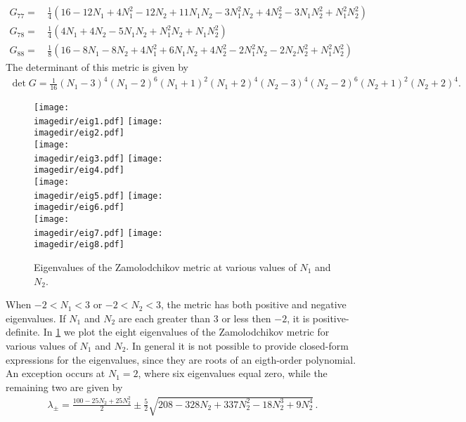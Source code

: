 \begin{subappendices}
\begin{align}
\nonumber \\
G_{77}=\,&\frac{1}{4} (16 - 12 N_1 + 4 N_1^2 - 12 N_2 + 11 N_1 N_2 - 3 N_1^2 N_2 + 4 N_2^2 - 3 N_1 N_2^2 + 
   N_1^2 N_2^2)
\nonumber \\
G_{78}=\,&\frac{1}{4} (4 N_1 + 4 N_2 - 5 N_1 N_2 + N_1^2 N_2 + N_1 N_2^2)
\nonumber \\
G_{88}=\,&\frac{1}{8} (16 - 8 N_1 - 8 N_2 + 4 N_1^2  + 6 N_1 N_2 + 4 N_2^2 - 2 N_1^2 N_2  - 2 N_2 N_2^2 + 
   N_1^2 N_2^2)
\end{align}
\endgroup
The determinant of this metric is given by
\begin{align*}
\det G = \frac{1}{16} (N_1-3)^4 (N_1-2 )^6 (N_1+1)^2 (N_1+2)^4 (N_2-3)^4 (N_2-2)^6 (N_2+1)^2 (N_2+2)^4.
\end{align*}

\begin{figure}[ht!]
\centering
\texttt{[image: \\imagedir/eig1.pdf]}
\hfill
\texttt{[image: \\imagedir/eig2.pdf]} \\

\texttt{[image: \\imagedir/eig3.pdf]}
\hfill
\texttt{[image: \\imagedir/eig4.pdf]} \\

\texttt{[image: \\imagedir/eig5.pdf]}
\hfill
\texttt{[image: \\imagedir/eig6.pdf]} \\

\texttt{[image: \\imagedir/eig7.pdf]}
\hfill
\texttt{[image: \\imagedir/eig8.pdf]}

\caption{Eigenvalues of the Zamolodchikov metric at various values of $N_1$ and $N_2$.}
\label{Eigenvalues}
\end{figure}

\noindent When $-2 < N_1 < 3$ or $-2 < N_2 < 3$, the metric has both positive and negative eigenvalues. If $N_1$ and $N_2$ are each greater than 3 or less then $-2$, it is positive-definite. In \cref{Eigenvalues} we plot the eight eigenvalues of the Zamolodchikov metric for various values of $N_1$ and $N_2$. In general it is not possible to provide closed-form expressions for the eigenvalues, since they are roots of an eigth-order polynomial. An exception occurs at $N_1=2$, where six eigenvalues equal zero, while the remaining two are given by
\begin{align}
\lambda_\pm = \frac{100-25N_2+25N_2^2}{2}
\pm \frac{5}{2}\sqrt{208-328N_2+337N_2^2-18N_2^3+9N_2^4}\,.
\end{align}




\end{subappendices}
